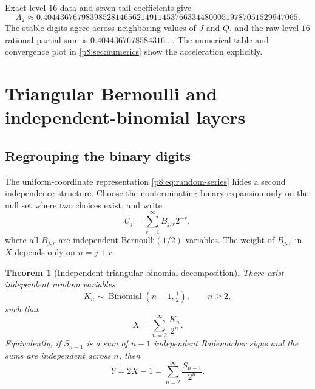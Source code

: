 \documentclass[11pt]{article}
\newtheorem{theorem}{Theorem}[section]
\theoremstyle{definition}
\theoremstyle{remark}
\begin{document}
\numerical Exact level-$16$ data and seven tail coefficients give
\begin{equation}
 A_2\approx
 0.404436767983985281465621491145376633448000519787051529947065. \label{p8:eq:A2-decimal}
\end{equation}
The stable digits agree across neighboring values of $J$ and $Q$, and the raw
level-$16$ rational partial sum is
$0.4044367678584316\ldots$.  The numerical table and convergence plot in
\cref{p8:sec:numerics} show the acceleration explicitly.

\section{Triangular Bernoulli and independent-binomial layers}
\label{p8:sec:triangular}

\subsection{Regrouping the binary digits}

The uniform-coordinate representation \eqref{p8:eq:random-series} hides a second
independence structure.  Choose the nonterminating binary expansion only on
the null set where two choices exist, and write
\begin{equation}
 U_j=\sum_{r=1}^\infty B_{j,r}2^{-r},                    \label{p8:eq:uniform-bits}
\end{equation}
where all $B_{j,r}$ are independent Bernoulli$(1/2)$ variables.  The weight of
$B_{j,r}$ in $X$ depends only on $n=j+r$.

\begin{theorem}[Independent triangular binomial decomposition]
\label{p8:thm:triangular-binomial}
There exist independent random variables
\begin{equation}
 K_n\sim\operatorname{Binomial}(n-1,\tfrac12),
 \qquad n\ge2,                                           \label{p8:eq:Kn-law}
\end{equation}
such that
\begin{equation}
 \boxed{\displaystyle
 X=\sum_{n=2}^\infty\frac{K_n}{2^n}.}                    \label{p8:eq:X-triangular}
\end{equation}
Equivalently, if $S_{n-1}$ is a sum of $n-1$ independent Rademacher signs and
the sums are independent across $n$, then
\begin{equation}
 \boxed{\displaystyle
 Y=2X-1=\sum_{n=2}^\infty\frac{S_{n-1}}{2^n}.}           \label{p8:eq:Y-triangular}
\end{equation}
\end{theorem}
\end{document}
